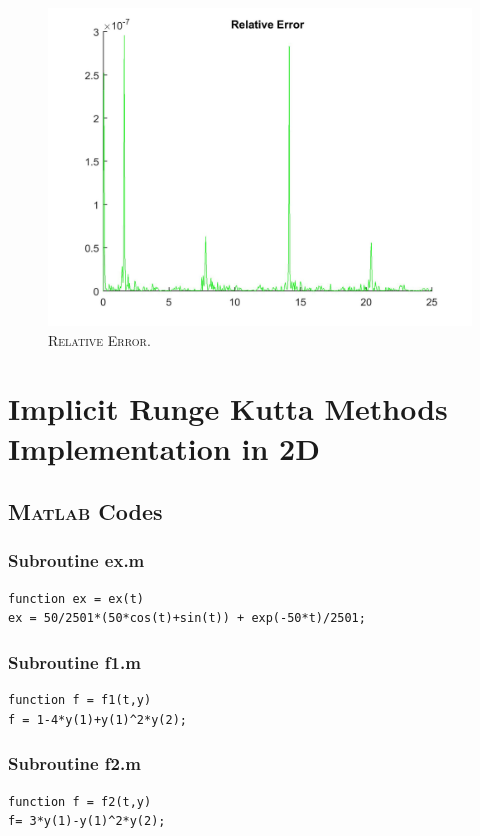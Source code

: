 \documentclass[a4paper,oneside]{book}
\numberwithin{equation}{chapter}
\begin{document}
\begin{figure}[H]
\centering
\includegraphics[scale=0.18]{im3}
\caption{\textsc{Relative Error.}}
\end{figure}
\section{Implicit Runge Kutta Methods Implementation in 2D}
\subsection{\textsc{Matlab} Codes}
\subsubsection{Subroutine ex.m}
\begin{verbatim}
function ex = ex(t)
ex = 50/2501*(50*cos(t)+sin(t)) + exp(-50*t)/2501;
\end{verbatim}
\subsubsection{Subroutine f1.m}
\begin{verbatim}
function f = f1(t,y)
f = 1-4*y(1)+y(1)^2*y(2);
\end{verbatim}
\subsubsection{Subroutine f2.m}
\begin{verbatim}
function f = f2(t,y)
f= 3*y(1)-y(1)^2*y(2);
\end{verbatim}
\end{document}
